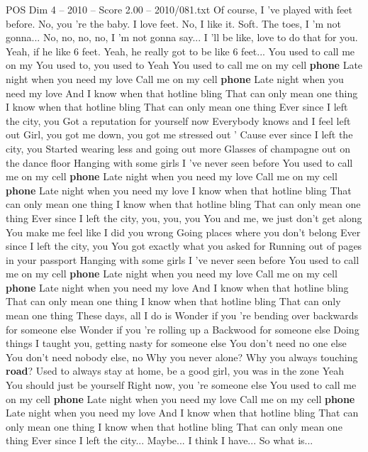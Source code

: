 \begin{textsample}{POS Dim 4 – 2010 – Score 2.00 – 2010/081.txt}  \label{ex:f4_pos_039}
Of course, I 've played with feet before.
No, you 're the baby.
I love feet.
No, I like it.
Soft.
The toes, I 'm not gonna...
No, no, no, no, I 'm not gonna say...
I 'll be like, love to do that for you.
Yeah, if he like 6 feet.
Yeah, he really got to be like 6 feet...
You used to call me on my You used to, you used to Yeah You used to call me on my cell \textbf{phone} Late night when you need my love Call me on my cell \textbf{phone} Late night when you need my love And I know when that hotline bling That can only mean one thing I know when that hotline bling That can only mean one thing Ever since I left the city, you Got a reputation for yourself now Everybody knows and I feel left out Girl, you got me down, you got me stressed out ' Cause ever since I left the city, you Started wearing less and going out more Glasses of champagne out on the dance floor Hanging with some girls I 've never seen before You used to call me on my cell \textbf{phone} Late night when you need my love Call me on my cell \textbf{phone} Late night when you need my love I know when that hotline bling That can only mean one thing I know when that hotline bling That can only mean one thing Ever since I left the city, you, you, you You and me, we just don't get along You make me feel like I did you wrong Going places where you don't belong Ever since I left the city, you You got exactly what you asked for Running out of pages in your passport Hanging with some girls I 've never seen before You used to call me on my cell \textbf{phone} Late night when you need my love Call me on my cell \textbf{phone} Late night when you need my love And I know when that hotline bling That can only mean one thing I know when that hotline bling That can only mean one thing These days, all I do is Wonder if you 're bending over backwards for someone else Wonder if you 're rolling up a Backwood for someone else Doing things I taught you, getting nasty for someone else You don't need no one else You don't need nobody else, no Why you never alone?
Why you always touching \textbf{road}?
Used to always stay at home, be a good girl, you was in the zone Yeah You should just be yourself Right now, you 're someone else You used to call me on my cell \textbf{phone} Late night when you need my love Call me on my cell \textbf{phone} Late night when you need my love And I know when that hotline bling That can only mean one thing I know when that hotline bling That can only mean one thing Ever since I left the city...
Maybe...
I think I have...
So what is...

\end{textsample}
